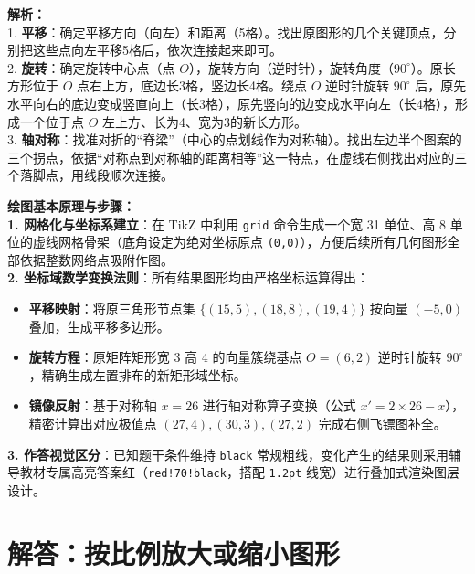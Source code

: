 \documentclass[12pt, a4paper]{ctexrep}
\begin{document}
\vspace{0.8cm}

{\small\color{gray}
\textbf{解析：}\\
1. \textbf{平移}：确定平移方向（向左）和距离（5格）。找出原图形的几个关键顶点，分别把这些点向左平移5格后，依次连接起来即可。\\
2. \textbf{旋转}：确定旋转中心点（点 $O$），旋转方向（逆时针），旋转角度（$90^{\circ}$）。原长方形位于 $O$ 点右上方，底边长3格，竖边长4格。绕点 $O$ 逆时针旋转 $90^{\circ}$ 后，原先水平向右的底边变成竖直向上（长3格），原先竖向的边变成水平向左（长4格），形成一个位于点 $O$ 左上方、长为4、宽为3的新长方形。\\
3. \textbf{轴对称}：找准对折的“脊梁”（中心的点划线作为对称轴）。找出左边半个图案的三个拐点，依据“对称点到对称轴的距离相等”这一特点，在虚线右侧找出对应的三个落脚点，用线段顺次连接。
}

\vspace{0.6cm}

{\small\color{blue!70!black}
\textbf{绘图基本原理与步骤：}\\
\textbf{1. 网格化与坐标系建立}：在 TikZ 中利用 \texttt{grid} 命令生成一个宽 31 单位、高 8 单位的虚线网格骨架（底角设定为绝对坐标原点 \texttt{(0,0)}），方便后续所有几何图形全部依据整数网络点吸附作图。\\
\textbf{2. 坐标域数学变换法则}：所有结果图形均由严格坐标运算得出：
   \begin{itemize}
       \item \textbf{平移映射}：将原三角形节点集 $\{(15,5), (18,8), (19,4)\}$ 按向量 $(-5, 0)$ 叠加，生成平移多边形。
       \item \textbf{旋转方程}：原矩阵矩形宽 3 高 4 的向量簇绕基点 $O=(6,2)$ 逆时针旋转 $90^{\circ}$，精确生成左置排布的新矩形域坐标。
       \item \textbf{镜像反射}：基于对称轴 $x=26$ 进行轴对称算子变换（公式 $x' = 2 \times 26 - x$），精密计算出对应极值点 $(27,4), (30,3), (27,2)$ 完成右侧飞镖图补全。
   \end{itemize}
\textbf{3. 作答视觉区分}：已知题干条件维持 \texttt{black} 常规粗线，变化产生的结果则采用辅导教材专属高亮答案红（\texttt{red!70!black}，搭配 \texttt{1.2pt} 线宽）进行叠加式渲染图层设计。
}


\newpage

\section{解答：按比例放大或缩小图形}

\vspace{0.4cm}
\end{document}

